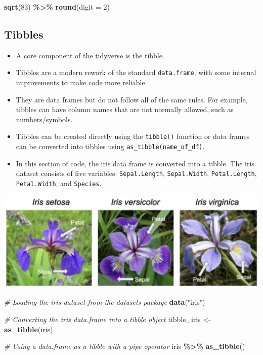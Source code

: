 \documentclass[
]{book}
\newenvironment{Shaded}{\begin{snugshade}}{\end{snugshade}}
\newcommand{\AttributeTok}[1]{\textcolor[rgb]{0.13,0.29,0.53}{#1}}
\newcommand{\CommentTok}[1]{\textcolor[rgb]{0.56,0.35,0.01}{\textit{#1}}}
\newcommand{\DecValTok}[1]{\textcolor[rgb]{0.00,0.00,0.81}{#1}}
\newcommand{\FunctionTok}[1]{\textcolor[rgb]{0.13,0.29,0.53}{\textbf{#1}}}
\newcommand{\NormalTok}[1]{#1}
\newcommand{\OtherTok}[1]{\textcolor[rgb]{0.56,0.35,0.01}{#1}}
\newcommand{\SpecialCharTok}[1]{\textcolor[rgb]{0.81,0.36,0.00}{\textbf{#1}}}
\newcommand{\StringTok}[1]{\textcolor[rgb]{0.31,0.60,0.02}{#1}}
\providecommand{\tightlist}{%
  \setlength{\itemsep}{0pt}\setlength{\parskip}{0pt}}
\begin{document}
\begin{Shaded}
\begin{Highlighting}[]
\FunctionTok{sqrt}\NormalTok{(}\DecValTok{83}\NormalTok{) }\SpecialCharTok{\%\textgreater{}\%} \FunctionTok{round}\NormalTok{(}\AttributeTok{digit =} \DecValTok{2}\NormalTok{)}
\end{Highlighting}
\end{Shaded}

\subsection{Tibbles}\label{tibbles}

\begin{itemize}
\tightlist
\item
  A core component of the tidyverse is the tibble.
\item
  Tibbles are a modern rework of the standard \texttt{data.frame}, with some internal improvements to make code more reliable.
\item
  They are data frames but do not follow all of the same rules. For example, tibbles can have column names that are not normally allowed, such as numbers/symbols.
\item
  Tibbles can be created directly using the \texttt{tibble()} function or data frames can be converted into tibbles using \texttt{as\_tibble(name\_of\_df)}.
\item
  In this section of code, the iris data frame is converted into a tibble. The iris dataset consists of five variables: \texttt{Sepal.Length}, \texttt{Sepal.Width}, \texttt{Petal.Length}, \texttt{Petal.Width}, and \texttt{Species}.
\end{itemize}

\includegraphics{./img/iris_data.png}

\begin{Shaded}
\begin{Highlighting}[]
\CommentTok{\# Loading the iris dataset from the datasets package}
\FunctionTok{data}\NormalTok{(}\StringTok{"iris"}\NormalTok{)}

\CommentTok{\# Converting the iris data.frame into a tibble object}
\NormalTok{tibble\_iris }\OtherTok{\textless{}{-}} \FunctionTok{as\_tibble}\NormalTok{(iris)}

\CommentTok{\# Using a data.frame as a tibble with a pipe operator}
\NormalTok{iris }\SpecialCharTok{\%\textgreater{}\%} \FunctionTok{as\_tibble}\NormalTok{()}
\end{Highlighting}
\end{Shaded}
\end{document}
